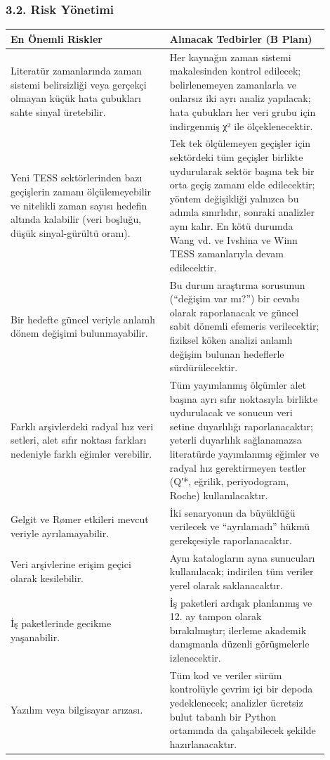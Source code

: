 \subsubsection*{3.2. Risk Yönetimi}
{\footnotesize\begin{longtable}{|p{0.450\linewidth}|p{0.450\linewidth}|}\hline
\textbf{En Önemli Riskler} & \textbf{Alınacak Tedbirler (B Planı)}\\\hline\endhead
Literatür zamanlarında zaman sistemi belirsizliği veya gerçekçi olmayan küçük hata çubukları sahte sinyal üretebilir. & Her kaynağın zaman sistemi makalesinden kontrol edilecek; belirlenemeyen zamanlarla ve onlarsız iki ayrı analiz yapılacak; hata çubukları her veri grubu için indirgenmiş χ² ile ölçeklenecektir.\\\hline
Yeni TESS sektörlerinden bazı geçişlerin zamanı ölçülemeyebilir ve nitelikli zaman sayısı hedefin altında kalabilir (veri boşluğu, düşük sinyal-gürültü oranı). & Tek tek ölçülemeyen geçişler için sektördeki tüm geçişler birlikte uydurularak sektör başına tek bir orta geçiş zamanı elde edilecektir; yöntem değişikliği yalnızca bu adımla sınırlıdır, sonraki analizler aynı kalır. En kötü durumda Wang vd. ve Ivshina ve Winn TESS zamanlarıyla devam edilecektir.\\\hline
Bir hedefte güncel veriyle anlamlı dönem değişimi bulunmayabilir. & Bu durum araştırma sorusunun (“değişim var mı?”) bir cevabı olarak raporlanacak ve güncel sabit dönemli efemeris verilecektir; fiziksel köken analizi anlamlı değişim bulunan hedeflerle sürdürülecektir.\\\hline
Farklı arşivlerdeki radyal hız veri setleri, alet sıfır noktası farkları nedeniyle farklı eğimler verebilir. & Tüm yayımlanmış ölçümler alet başına ayrı sıfır noktasıyla birlikte uydurulacak ve sonucun veri setine duyarlılığı raporlanacaktır; yeterli duyarlılık sağlanamazsa literatürde yayımlanmış eğimler ve radyal hız gerektirmeyen testler (Q′*, eğrilik, periyodogram, Roche) kullanılacaktır.\\\hline
Gelgit ve Rømer etkileri mevcut veriyle ayrılamayabilir. & İki senaryonun da büyüklüğü verilecek ve “ayrılamadı” hükmü gerekçesiyle raporlanacaktır.\\\hline
Veri arşivlerine erişim geçici olarak kesilebilir. & Aynı katalogların ayna sunucuları kullanılacak; indirilen tüm veriler yerel olarak saklanacaktır.\\\hline
İş paketlerinde gecikme yaşanabilir. & İş paketleri ardışık planlanmış ve 12. ay tampon olarak bırakılmıştır; ilerleme akademik danışmanla düzenli görüşmelerle izlenecektir.\\\hline
Yazılım veya bilgisayar arızası. & Tüm kod ve veriler sürüm kontrolüyle çevrim içi bir depoda yedeklenecek; analizler ücretsiz bulut tabanlı bir Python ortamında da çalışabilecek şekilde hazırlanacaktır.\\\hline
\end{longtable}}
